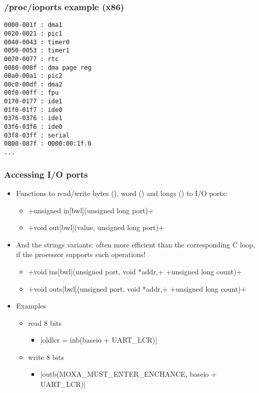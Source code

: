 \begin{frame}[fragile]
  \frametitle{/proc/ioports example (x86)}
{\small
\begin{verbatim}
0000-001f : dma1
0020-0021 : pic1
0040-0043 : timer0
0050-0053 : timer1
0070-0077 : rtc
0080-008f : dma page reg
00a0-00a1 : pic2
00c0-00df : dma2
00f0-00ff : fpu
0170-0177 : ide1
01f0-01f7 : ide0
0376-0376 : ide1
03f6-03f6 : ide0
03f8-03ff : serial
0800-087f : 0000:00:1f.0
...
\end{verbatim}
}
\end{frame}

\begin{frame}[fragile]
  \frametitle{Accessing I/O ports}
  \begin{itemize}
  \item Functions to read/write bytes (), word () and longs () to I/O ports:
    \begin{itemize}
    \item {}+unsigned in[bwl](unsigned long port)+
    \item {}+void out[bwl](value, unsigned long port)+
    \end{itemize}
  \item And the strings variants: often more efficient than the
    corresponding C loop, if the processor supports such operations!
    \begin{itemize}
    \item {}+void ins[bwl](unsigned port, void *addr,+
      +unsigned long count)+
    \item {}+void outs[bwl](unsigned port, void *addr,+
      +unsigned long count)+
    \end{itemize}
  \item Examples
    \begin{itemize}
    \item read 8 bits
      \begin{itemize}
      \item {}|oldlcr = inb(baseio + UART_LCR)|
      \end{itemize}
    \item write 8 bits
      \begin{itemize}
      \item {}|outb(MOXA_MUST_ENTER_ENCHANCE, baseio + UART_LCR)|
      \end{itemize}
    \end{itemize}
  \end{itemize}
\end{frame}

